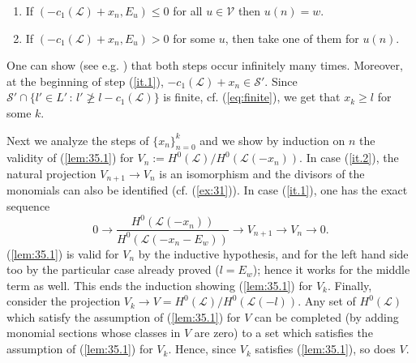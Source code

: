\documentclass[10pt,a4paper]{amsart}
\numberwithin{equation}{section}
\numberwithin{equation}{subsection}
\theoremstyle{plain}
\theoremstyle{definition}
\begin{document}
\begin{enumerate}[\ \ \ \ (a)]
\item\label{it.1}
If $(-c_1({\mathcal{L}})+x_n, E_u)\leq 0$ for all $u\in{\mathcal{V}}$ then
$u(n)=w$.
\item\label{it.2}
If $(-c_1({\mathcal{L}})+x_n,E_u)>0$ for some $u$, then take one of
them for $u(n)$.
\end{enumerate}
One can show (see e.g. \cite[(4.2)]{Line}) that both steps occur
infinitely many times.  Moreover, at the beginning of step
(\ref{it.1}), $-c_1({\mathcal{L}})+x_n\in{\mathcal{S}}'$. Since
${\mathcal{S}}'\cap\{l'\in L'\,:\, l'\not\geq l-c_1({\mathcal{L}})\}$ is
finite, cf. (\ref{eq:finite}), we get that $x_k\geq l$ for some
$k$.

Next we analyze the steps of $\{x_n\}_{n=0}^k$ and we show by
induction on $n$ the validity of (\ref{lem:35.1}) for
$V_n:=H^0({\mathcal{L}})/H^0({\mathcal{L}}(-x_n))$. In case
(\ref{it.2}), the natural projection $V_{n+1}\to
V_n$ is an isomorphism and the divisors of the monomials can also
be identified  (cf. (\ref{ex:31})).
In case (\ref{it.1}), one has the exact sequence
\begin{equation*}
0\longrightarrow
\frac{H^0({\mathcal{L}}(-x_n))}{H^0({\mathcal{L}}(-x_n-E_w))}\longrightarrow
V_{n+1}\longrightarrow
V_n\longrightarrow 0.
\end{equation*}
(\ref{lem:35.1}) is valid for $V_n$ by the inductive hypothesis,
and for the left hand side too by the particular case already
proved ($l=E_w$); hence it works for the middle term as well. This
ends the induction showing (\ref{lem:35.1}) for $V_k$.  Finally,
consider the projection $V_k\to
V=H^0({\mathcal{L}})/H^0({\mathcal{L}}(-l))$. Any set of
$H^0({\mathcal{L}})$ which satisfy the assumption of
(\ref{lem:35.1}) for $V$ can be completed (by adding monomial
sections whose classes in $V$ are zero) to a set which satisfies
the assumption of (\ref{lem:35.1}) for $V_k$. Hence, since $V_k$
satisfies (\ref{lem:35.1}), so does $V$.


\end{document}
